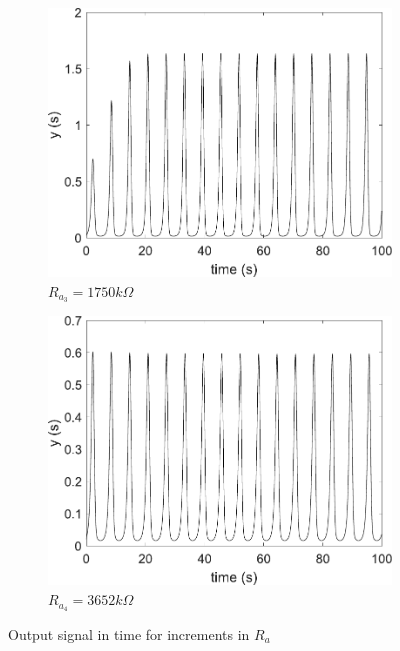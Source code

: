 \begin{figure}
        \begin{subfigure}[b]{0.22\textwidth}   
            \centering 
            \includegraphics[scale=0.28]{figs/paraA/outParaA1750.pdf}
            \caption{$R_{a_3} = 1750k\Omega$}    
        \end{subfigure}
        \begin{subfigure}[b]{0.22\textwidth}   
            \centering 
            \includegraphics[scale=0.28]{figs/paraA/outParaA3652.pdf}
            \caption{$R_{a_4} = 3652k\Omega$}   
        \end{subfigure}
        \caption{Output signal in time for increments in $R_a$} 
        \label{fig:paraAvar}
	\end{figure}
    
